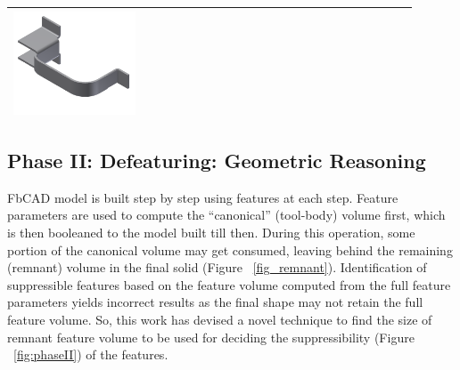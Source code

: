 \begin{minipage}[t]{0.9\linewidth}
\begin{tabular}[h]{@{} p{0.3\linewidth} | p{0.3\linewidth} | p{0.3\linewidth}@{}}
\includegraphics[width=0.98\linewidth]{..//Common/images/DefeatBracketPhase_I_3} \\ \bottomrule

\end{tabular}
\label{fig:phaseI}
\end{minipage}

\subsection{Phase II: Defeaturing: Geometric Reasoning} \label{ph2}

FbCAD model is built step by step using features at each step. Feature parameters are used to compute the ``canonical'' (tool-body) volume first, which is then booleaned to the model built till then. During this operation, some portion of the canonical volume may get consumed, leaving behind the remaining (remnant) volume in the final solid  (Figure ~\ref{fig_remnant}). Identification of suppressible features based on the feature volume computed from the full feature parameters yields incorrect results \cite{Russ2012} as the final shape may not retain the full feature volume. So, this work has devised a novel technique  to find the size of remnant feature volume to be used for deciding the suppressibility  (Figure ~\ref{fig:phaseII}) of the features.

\vspace{-1cm}

